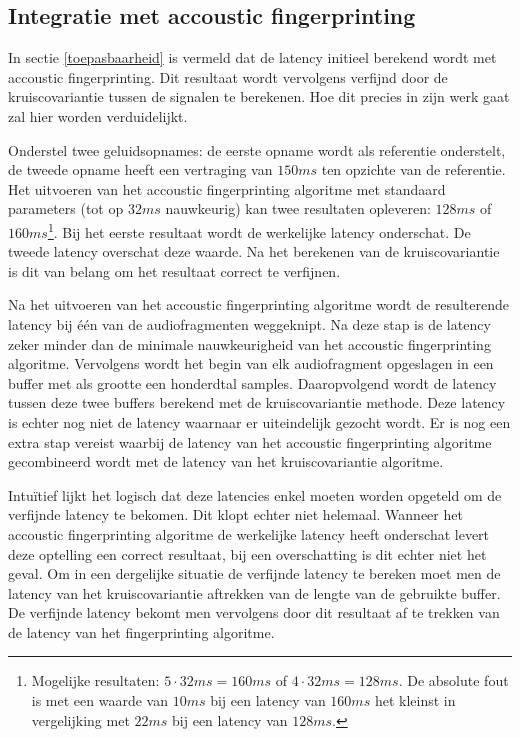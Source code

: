 \subsection{Integratie met accoustic fingerprinting}
\label{integratie-accoustic-fingerprinting}

In sectie \ref{toepasbaarheid} is vermeld dat de latency initieel berekend wordt met accoustic fingerprinting. Dit resultaat wordt vervolgens verfijnd door de kruiscovariantie tussen de signalen te berekenen. Hoe dit precies in zijn werk gaat zal hier worden verduidelijkt.

Onderstel twee geluidsopnames: de eerste opname wordt als referentie onderstelt, de tweede opname heeft een vertraging van $ 150 ms $ ten opzichte van de referentie. Het uitvoeren van het accoustic fingerprinting algoritme met standaard parameters (tot op $ 32 ms $ nauwkeurig) kan twee resultaten opleveren: $ 128 ms $ of $ 160 ms $\footnote{Mogelijke resultaten: $ 5 \cdot 32 ms = 160 ms$ of $ 4 \cdot 32 ms = 128 ms $. De absolute fout is  met een waarde van $ 10 ms $ bij een latency van $ 160 ms $ het kleinst in vergelijking met $ 22 ms $ bij een latency van $ 128 ms $.}. Bij het eerste resultaat wordt de werkelijke latency onderschat. De tweede latency overschat deze waarde. Na het berekenen van de kruiscovariantie is dit van belang om het resultaat correct te verfijnen.

Na het uitvoeren van het accoustic fingerprinting algoritme wordt de resulterende latency bij één van de audiofragmenten weggeknipt. Na deze stap is de latency zeker minder dan de minimale nauwkeurigheid van het accoustic fingerprinting algoritme. Vervolgens wordt het begin van elk audiofragment opgeslagen in een buffer met als grootte een honderdtal samples. Daaropvolgend wordt de latency tussen deze twee buffers berekend met de kruiscovariantie methode. Deze latency is echter nog niet de latency waarnaar er uiteindelijk gezocht wordt. Er is nog een extra stap vereist waarbij de latency van het accoustic fingerprinting algoritme gecombineerd wordt met de latency van het kruiscovariantie algoritme.

Intuïtief lijkt het logisch dat deze latencies enkel moeten worden opgeteld om de verfijnde latency te bekomen. Dit klopt echter niet helemaal. Wanneer het accoustic fingerprinting algoritme de werkelijke latency heeft onderschat levert deze optelling een correct resultaat, bij een overschatting is dit echter niet het geval. Om in een dergelijke situatie de verfijnde latency te bereken moet men de latency van het kruiscovariantie aftrekken van de lengte van de gebruikte buffer. De verfijnde latency bekomt men vervolgens door dit resultaat af te trekken van de latency van het fingerprinting algoritme.

